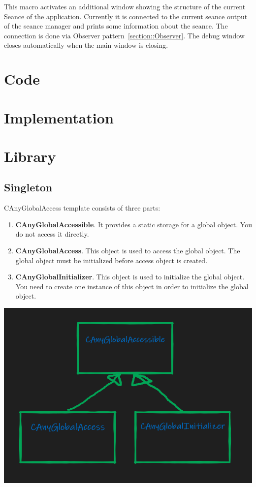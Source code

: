 \documentclass{article}
\begin{document}
This macro activates an additional window showing the structure of the current Seance of the application. Currently it is connected to the current seance output of the seance manager and prints some information about the seance. The connection is done via Observer pattern~\ref{section::Observer}. The debug window closes automatically when the main window is closing.

\section{Code}

\section{Implementation}

\section{Library}
\subsection{Singleton}\label{section::Singleton}
CAnyGlobalAccess template consists of three parts:
\begin{enumerate}
\item \textbf{CAnyGlobalAccessible}. It provides a static storage for a global object. You do not access it directly.
\item \textbf{CAnyGlobalAccess}. This object is used to access the global object. The global object must be initialized before access object is created.
\item \textbf{CAnyGlobalInitializer}. This object is used to initialize the global object. You need to create one instance of this object in order to initialize the global object.
\end{enumerate}
\begin{center}
\includegraphics[scale = 0.3]{Figures/CAnyGlobalAccess.png}
\end{center}
\end{document}
